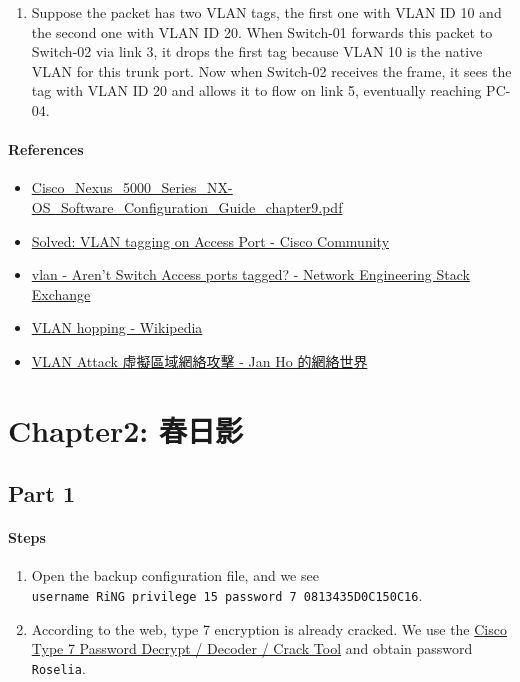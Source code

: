 \documentclass[12pt, a4paper]{article}
\begin{document}
\begin{enumerate}
    \item Suppose the packet has two VLAN tags, the first one with VLAN ID 10
    and the second one with VLAN ID 20. When Switch-01 forwards this packet to
    Switch-02 via link 3, it drops the first tag because VLAN 10 is the native
    VLAN for this trunk port. Now when Switch-02 receives the frame, it sees the
    tag with VLAN ID 20 and allows it to flow on link 5, eventually reaching
    PC-04.
  \end{enumerate}

  \paragraph{References}
  \begin{itemize}
    \item \href{https://www.cisco.com/en/US/docs/switches/datacenter/nexus5000/sw/configuration/nxos/Cisco_Nexus_5000_Series_NX-OS_Software_Configuration_Guide_chapter9.pdf}{Cisco\_Nexus\_5000\_Series\_NX-OS\_Software\_Configuration\_Guide\_chapter9.pdf}
    \item \href{https://community.cisco.com/t5/switching/vlan-tagging-on-access-port/td-p/4056567}{Solved: VLAN tagging on Access Port - Cisco Community}
    \item \href{https://networkengineering.stackexchange.com/questions/40483/arent-switch-access-ports-tagged}{vlan - Aren't Switch Access ports tagged? - Network Engineering Stack Exchange}
    \item \href{https://en.wikipedia.org/wiki/VLAN_hopping}{VLAN hopping - Wikipedia}
    \item \href{https://www.jannet.hk/virtual-lan-vlan-attack-zh-hant/}{VLAN Attack 虛擬區域網絡攻擊 - Jan Ho 的網絡世界}
  \end{itemize}
  \section*{Chapter2: 春日影}
  \subsection*{Part 1}
  \paragraph{Steps}
  \begin{enumerate}
    \item Open the backup configuration file, and we see\\
    \verb|username RiNG privilege 15 password 7 0813435D0C150C16|.
    \item According to the web, type 7 encryption is already cracked. We use the
    \href{https://www.firewall.cx/cisco/cisco-routers/cisco-type7-password-crack.html}{Cisco Type 7 Password Decrypt / Decoder / Crack Tool}
    and obtain password \verb|Roselia|.
  \end{enumerate}
\end{document}
